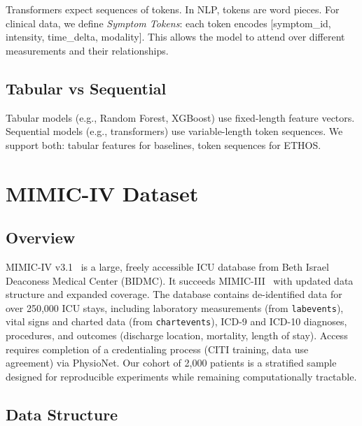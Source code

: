 Transformers expect sequences of tokens. In NLP, tokens are word pieces. For clinical data, we define \emph{Symptom Tokens}: each token encodes [symptom\_id, intensity, time\_delta, modality]. This allows the model to attend over different measurements and their relationships.

\subsection{Tabular vs Sequential}

Tabular models (e.g., Random Forest, XGBoost) use fixed-length feature vectors. Sequential models (e.g., transformers) use variable-length token sequences. We support both: tabular features for baselines, token sequences for ETHOS.

\section{MIMIC-IV Dataset}

\subsection{Overview}

MIMIC-IV v3.1~\cite{johnson2023mimic} is a large, freely accessible ICU database from Beth Israel Deaconess Medical Center (BIDMC). It succeeds MIMIC-III~\cite{johnson2016mimic} with updated data structure and expanded coverage. The database contains de-identified data for over 250,000 ICU stays, including laboratory measurements (from \texttt{labevents}), vital signs and charted data (from \texttt{chartevents}), ICD-9 and ICD-10 diagnoses, procedures, and outcomes (discharge location, mortality, length of stay). Access requires completion of a credentialing process (CITI training, data use agreement) via PhysioNet. Our cohort of 2,000 patients is a stratified sample designed for reproducible experiments while remaining computationally tractable.

\subsection{Data Structure}

